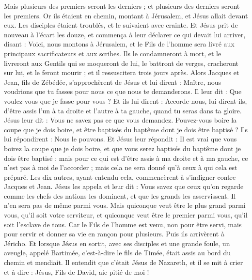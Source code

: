 \begin{multicols}{2}
Mais plusieurs des premiers seront les derniers ; et plusieurs des derniers seront les premiers.
Or ils étaient en chemin, montant à Jérusalem, et Jésus allait devant eux. Les disciples étaient troublés, et le suivaient avec crainte. Et Jésus prit de nouveau à l'écart les douze, et commença à leur déclarer ce qui devait lui arriver,
disant : Voici, nous montons à Jérusalem, et le Fils de l'homme sera livré aux principaux sacrificateurs et aux scribes. Ils le condamneront à mort, et le livreront aux Gentils
qui se moqueront de lui, le battront de verges, cracheront sur lui, et le feront mourir ; et il ressuscitera trois jours après.
Alors Jacques et Jean, fils de Zébédée, s’approchèrent de Jésus et lui dirent : Maître, nous voudrions que tu fasses pour nous ce que nous te demanderons.
Il leur dit : Que voulez-vous que je fasse pour vous ?
Et ils lui dirent : Accorde-nous, lui dirent-ils, d’être assis l’un à ta droite et l’autre à ta gauche, quand tu seras dans ta gloire.
Jésus leur dit : Vous ne savez pas ce que vous demandez. Pouvez-vous boire la coupe que je dois boire, et être baptisés du baptême dont je dois être baptisé ?
Ils lui répondirent : Nous le pouvons. Et Jésus leur répondit : Il est vrai que vous boirez la coupe que je dois boire, et que vous serez baptisés du baptême dont je dois être baptisé ;
mais pour ce qui est d'être assis à ma droite et à ma gauche, ce n'est pas à moi de l’accorder ; mais cela ne sera donné qu’à ceux à qui cela est préparé.
Les dix autres, ayant entendu cela, commencèrent à s’indigner contre Jacques et Jean.
Jésus les appela et leur dit : Vous savez que ceux qu’on regarde comme les chefs des nations les dominent, et que les grands les asservissent.
Il n'en sera pas de même parmi vous. Mais quiconque veut être le plus grand parmi vous, qu’il soit votre serviteur,
et quiconque veut être le premier parmi vous, qu’il soit l’esclave de tous.
Car le Fils de l'homme est venu, non pour être servi, mais pour servir et donner sa vie en rançon pour plusieurs.
Puis ils arrivèrent à Jéricho. Et lorsque Jésus en sortit, avec ses disciples et une grande foule, un aveugle, appelé Bartimée, c'est-à-dire le fils de Timée, était assis au bord du chemin et mendiait.
Il entendit que c'était Jésus de Nazareth, et il se mit à crier et à dire : Jésus, Fils de David, aie pitié de moi !

\end{multicols}
